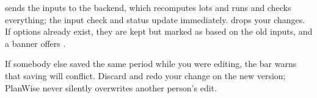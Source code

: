 
 sends the inputs to the backend, which recomputes lots and runs and checks everything; the
input check and status update immediately.  drops your changes. If options already exist, they
are kept but marked as based on the old inputs, and a banner offers .

\begin{warning}
If somebody else saved the same period while you were editing, the bar warns that saving will conflict.
Discard and redo your change on the new version; PlanWise never silently overwrites another person's edit.
\end{warning}
